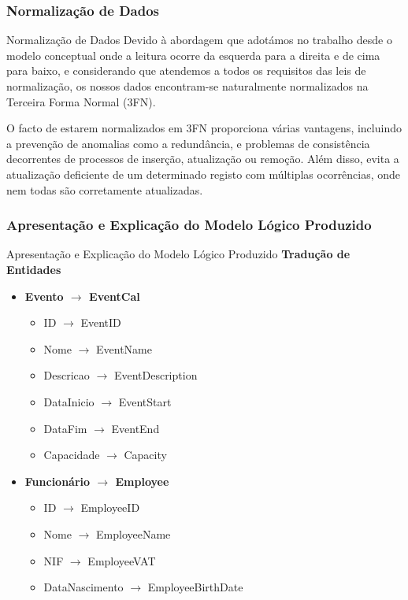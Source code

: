 \documentclass[compress,svgnames,handout,13.7pt]{beamer}
\begin{document}
\subsubsection{Normalização de Dados}
\begin{frame}{Normalização de Dados}
Devido à abordagem que adotámos no trabalho desde o modelo conceptual onde a leitura ocorre da esquerda para a direita e de cima para baixo, e considerando que atendemos a todos os requisitos das leis de normalização, os nossos dados encontram-se naturalmente normalizados na Terceira Forma Normal (3FN).

O facto de estarem normalizados em 3FN proporciona várias vantagens, incluindo a prevenção de anomalias como a redundância, 
e problemas de consistência decorrentes de processos de inserção, atualização ou remoção. 
Além disso, evita a atualização deficiente de um determinado registo com múltiplas ocorrências, onde nem todas são corretamente atualizadas.
\end{frame}

\subsubsection{Apresentação e Explicação do Modelo Lógico Produzido}
\begin{frame}{Apresentação e Explicação do Modelo Lógico Produzido}
\textbf{Tradução de Entidades}
    \begin{itemize}
        \item{\textbf{Evento $\rightarrow$ EventCal}}
            \begin{itemize}
                \item{ID $\rightarrow$ EventID}
                \item{Nome $\rightarrow$ EventName}
                \item{Descricao $\rightarrow$ EventDescription}
                \item{DataInicio $\rightarrow$ EventStart}
                \item{DataFim $\rightarrow$ EventEnd}
                \item{Capacidade $\rightarrow$ Capacity}
            \end{itemize}
        \item{\textbf{Funcionário $\rightarrow$ Employee}}
            \begin{itemize}
                \item{ID $\rightarrow$ EmployeeID}
                \item{Nome $\rightarrow$ EmployeeName}
                \item{NIF $\rightarrow$ EmployeeVAT}
                \item{DataNascimento $\rightarrow$ EmployeeBirthDate}
            \end{itemize}
    \end{itemize}
\end{frame}
\end{document}
